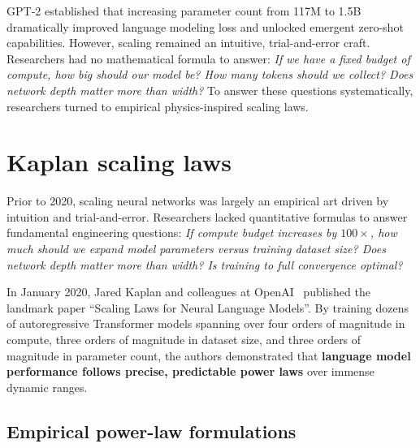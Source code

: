 \documentclass[../../main.tex]{subfiles}
\begin{document}
GPT-2 established that increasing parameter count from 117M to 1.5B dramatically improved language modeling loss and unlocked emergent zero-shot capabilities. However, scaling remained an intuitive, trial-and-error craft. Researchers had no mathematical formula to answer: \emph{If we have a fixed budget of compute, how big should our model be? How many tokens should we collect? Does network depth matter more than width?} To answer these questions systematically, researchers turned to empirical physics-inspired scaling laws.

\clearpage
\section{Kaplan scaling laws}
\label{sec:kaplan_scaling_laws}

Prior to 2020, scaling neural networks was largely an empirical art driven by intuition and trial-and-error. Researchers lacked quantitative formulas to answer fundamental engineering questions: \emph{If compute budget increases by $100\times$, how much should we expand model parameters versus training dataset size? Does network depth matter more than width? Is training to full convergence optimal?}

In January 2020, Jared Kaplan and colleagues at OpenAI~\cite{kaplan2020} published the landmark paper ``Scaling Laws for Neural Language Models''. By training dozens of autoregressive Transformer models spanning over four orders of magnitude in compute, three orders of magnitude in dataset size, and three orders of magnitude in parameter count, the authors demonstrated that \textbf{language model performance follows precise, predictable power laws} over immense dynamic ranges.

\subsection{Empirical power-law formulations}
\label{subsec:kaplan_power_laws}
\end{document}
